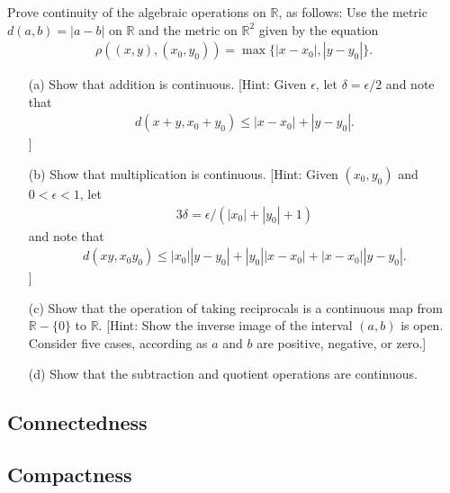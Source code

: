   \begin{exercise}[Munkres 21.12]
    Prove continuity of the algebraic operations on $\mathbb{R}$, as follows: Use the metric $d(a, b) = |a - b|$ on $\mathbb{R}$ and the metric on $\mathbb{R}^2$ given by the equation
    \begin{align*}
      \rho((x, y), (x_0, y_0)) = \max\{|x - x_0|, |y - y_0|\}.
    \end{align*}
    \begin{enumerate} 
      \item[(a)] Show that addition is continuous. [Hint: Given $\epsilon$, let $\delta = \epsilon/2$ and note that 
      \begin{align*}
        d(x + y, x_0 + y_0) \leq |x - x_0| + |y - y_0|.
      \end{align*}
      ]
      \item[(b)] Show that multiplication is continuous. [Hint: Given $(x_0, y_0)$ and $0 < \epsilon < 1$, let 
      \begin{align*}
        3\delta = \epsilon/(|x_0| + |y_0| + 1)
      \end{align*}
      and note that
      \begin{align*}
        d(xy, x_0y_0) \leq |x_0||y - y_0| + |y_0||x - x_0| + |x - x_0||y - y_0|.
      \end{align*}
      ]
      \item[(c)] Show that the operation of taking reciprocals is a continuous map from $\mathbb{R} - \{0\}$ to $\mathbb{R}$. [Hint: Show the inverse image of the interval $(a, b)$ is open. Consider five cases, according as $a$ and $b$ are positive, negative, or zero.]
      \item[(d)] Show that the subtraction and quotient operations are continuous.
    \end{enumerate}
  \end{exercise}

\subsection{Connectedness}

\subsection{Compactness}

